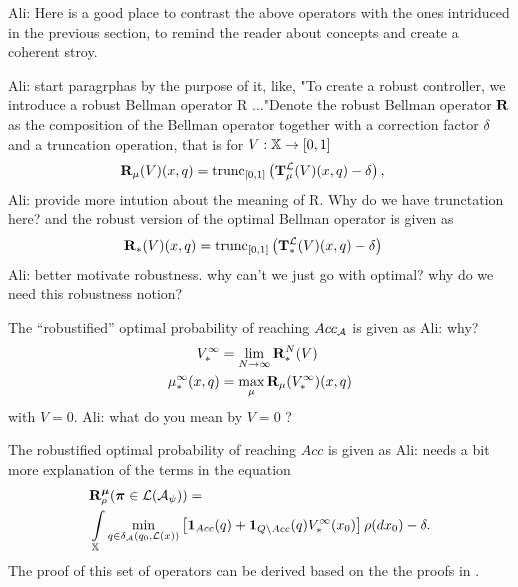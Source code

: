 \documentclass{ifacconf}
\renewcommand{\axx}[1]{{\color{orange} Ali: #1}}
\begin{document}
\axx{Here is a good place to contrast the above operators with the ones intriduced in the previous section, to remind the reader about concepts and create a coherent stroy.}

\axx{start paragrphas by the purpose of it, like, "To create a robust controller, we introduce a robust Bellman operator R ..."}Denote the robust Bellman operator ${\mathbf {R}}$ as the composition of the Bellman operator together with a correction factor $\delta$ and  a truncation operation, that is for $V:{\mathbb{X}}\rightarrow [0,1]$
\begin{align}\label{eq:V_recopt_inf}
& {\mathbf {R}}_{\mu} (V)(x,q) = \mathop{\mathrm{trunc}}\nolimits_{[0,1]}\left({\mathbf {T}}_{\mu}^{\mathcal{L}} (V)(x,q)-\delta\right),
\end{align}
\axx{provide more intution about the meaning of R. Why do we have trunctation here?}
and the robust version of the optimal Bellman operator is given as 
\begin{align}\label{eq:V_recopt_inf}
& {\mathbf {R}}_\ast (V)(x,q)= \mathop{\mathrm{trunc}}\nolimits_{[0,1]}\left({\mathbf {T}}_\ast^{\mathcal{L}} (V)(x,q)-\delta\right)
\end{align}
\axx{better motivate robustness. why can't we just go with optimal? why do we need this robustness notion?}

The ``robustified'' optimal probability of reaching $Acc_{\mathcal{A}}$ is given as
\axx{why?}
\begin{align}
	V^\infty_\ast & =\lim_{N\rightarrow \infty}{\mathbf {R}}_\ast^N (V) \\
	{\mu}^\infty_\ast(x,q)  &= \max_{\mu} {\mathbf {R}}_{\mu} (V_\ast^\infty)(x,q) 
\end{align}
with $V=0$.
\axx{what do you mean by $V=0$ ?}

The robustified optimal probability of reaching $Acc$ is given as
\axx{needs a bit more explanation of the terms in the equation}
\begin{align}
&\BelR_\init^\polb
(\word \in\mathcal L(\mathcal A_\psi))=\\ & \int_{\X}\min_{\bar q \in \delta_\FSA(q_0,\Labset(\bar x))}\left[\mathbf 1_{Acc}(\bar q)+ \mathbf 1_{Q \setminus Acc}(\bar q) V^\infty_\ast(x_0) \right]%
\init (d x_0)-\delta.
\end{align} 
The proof of this set of operators can be derived based on the the proofs in \citep{tech_report_TACAS}.
 
\end{document}
